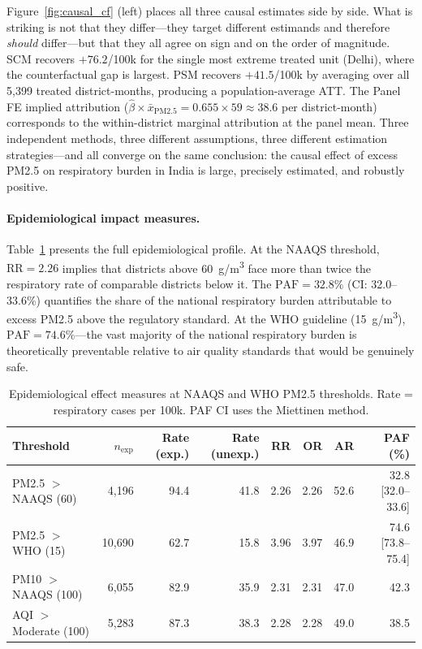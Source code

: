 \documentclass{article}
\begin{document}
Figure~\ref{fig:causal_cf} (left) places all three causal estimates side by side. What
is striking is not that they differ---they target different estimands and therefore
\emph{should} differ---but that they all agree on sign and on the order of magnitude.
SCM recovers $+76.2$/100k for the single most extreme treated unit (Delhi), where the
counterfactual gap is largest. PSM recovers $+41.5$/100k by averaging over all
5,399 treated district-months, producing a population-average ATT. The Panel FE implied
attribution ($\hat{\beta} \times \bar{x}_{\text{PM2.5}} = 0.655 \times 59 \approx 38.6$
per district-month) corresponds to the within-district marginal attribution at the panel
mean. Three independent methods, three different assumptions, three different estimation
strategies---and all converge on the same conclusion: the causal effect of excess PM2.5
on respiratory burden in India is large, precisely estimated, and robustly positive.

\paragraph{Epidemiological impact measures.}
Table~\ref{tab:epi} presents the full epidemiological profile. At the NAAQS threshold,
$\mathrm{RR} = 2.26$ implies that districts above 60~\textmu{}g/m\textsuperscript{3}
face more than twice the respiratory rate of comparable districts below it. The
$\mathrm{PAF} = 32.8\%$ (CI: 32.0--33.6\%) quantifies the share of the national
respiratory burden attributable to excess PM2.5 above the regulatory standard. At the WHO
guideline (15~\textmu{}g/m\textsuperscript{3}), $\mathrm{PAF} = 74.6\%$---the vast
majority of the national respiratory burden is theoretically preventable relative to air
quality standards that would be genuinely safe.

\begin{table}[ht]
  \caption{Epidemiological effect measures at NAAQS and WHO PM2.5 thresholds.
  Rate = respiratory cases per 100k. PAF CI uses the Miettinen method.}
  \label{tab:epi}
  \centering
  \small
  \begin{tabular}{lrrrrrrr}
    \toprule
    Threshold & $n_{\text{exp}}$ & Rate (exp.) & Rate (unexp.) & RR & OR & AR & PAF (\%) \\
    \midrule
    PM2.5 $>$ NAAQS (60) & 4,196 & 94.4 & 41.8 & 2.26 & 2.26 & 52.6 & 32.8 [32.0--33.6] \\
    PM2.5 $>$ WHO (15)   & 10,690 & 62.7 & 15.8 & 3.96 & 3.97 & 46.9 & 74.6 [73.8--75.4] \\
    PM10 $>$ NAAQS (100) & 6,055 & 82.9 & 35.9 & 2.31 & 2.31 & 47.0 & 42.3 \\
    AQI $>$ Moderate (100)& 5,283 & 87.3 & 38.3 & 2.28 & 2.28 & 49.0 & 38.5 \\
    \bottomrule
  \end{tabular}
\end{table}
\end{document}
